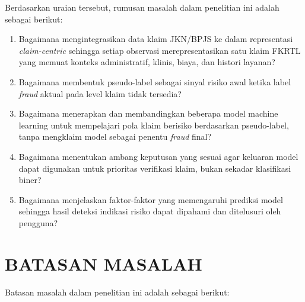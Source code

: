 Berdasarkan uraian tersebut, rumusan masalah dalam penelitian ini adalah sebagai berikut:

\begin{enumerate}[label=\arabic*., leftmargin=*]
  \item Bagaimana mengintegrasikan data klaim JKN/BPJS ke dalam representasi \textit{claim-centric} sehingga setiap observasi merepresentasikan satu klaim FKRTL yang memuat konteks administratif, klinis, biaya, dan histori layanan?
  \item Bagaimana membentuk pseudo-label sebagai sinyal risiko awal ketika label \textit{fraud} aktual pada level klaim tidak tersedia?
  \item Bagaimana menerapkan dan membandingkan beberapa model machine learning untuk mempelajari pola klaim berisiko berdasarkan pseudo-label, tanpa mengklaim model sebagai penentu \textit{fraud} final?
  \item Bagaimana menentukan ambang keputusan yang sesuai agar keluaran model dapat digunakan untuk prioritas verifikasi klaim, bukan sekadar klasifikasi biner?
  \item Bagaimana menjelaskan faktor-faktor yang memengaruhi prediksi model sehingga hasil deteksi indikasi risiko dapat dipahami dan ditelusuri oleh pengguna?
\end{enumerate}

\section{BATASAN MASALAH}

Batasan masalah dalam penelitian ini adalah sebagai berikut:

